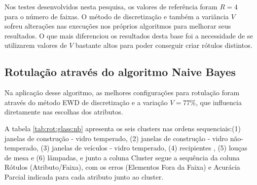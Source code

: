Nos testes desenvolvidos nesta pesquisa, os valores de referência foram ${R=4}$ para o número de faixas. O método de discretização e também a variância ${V}$ sofreu alterações nas execuções nos próprios algoritmos para melhorar seus resultados. O que mais diferenciou os resultados desta base foi a necessidade de se utilizarem valores de ${V}$ bastante altos para poder conseguir criar rótulos distintos. 

\subsection{Rotulação através do algoritmo Naive Bayes} \label{cap:resultados:ssec:glass:nb}

 

Na aplicação desse algoritmo, as melhores configurações para rotulação foram através do método EWD de discretização e a variação  ${V=77\%}$, que influencia diretamente nas escolhas dos atributos. 

 A tabela \ref{tab:rot:glass:nb}  apresenta os seis clusters nas ordens sequenciais:(1) janelas de construção - vidro temperado, (2) janelas de construção - vidro não-temperado, (3) janelas de veículos - vidro temperado, (4) recipientes , (5) louças de mesa e (6) lâmpadas, e junto a coluna Cluster segue a sequência da coluna Rótulos (Atributo/Faixa), com os erros (Elementos Fora da Faixa) e Acurácia Parcial indicada para cada atributo junto ao cluster. 
 

